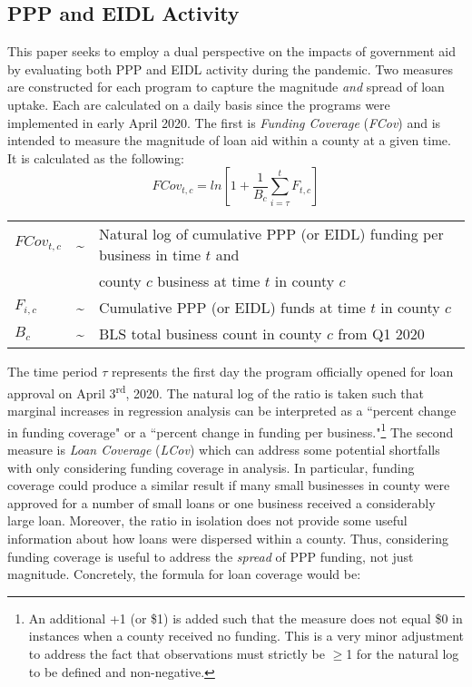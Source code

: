 \documentclass[11pt]{article} %
\begin{document}
\subsection{PPP and EIDL Activity}
This paper seeks to employ a dual perspective on the impacts of government aid by evaluating both PPP and EIDL activity during the pandemic. Two measures are constructed for each program to capture the magnitude \textit{and} spread of loan uptake. Each are calculated on a daily basis since the programs were implemented in early April 2020. The first is \textit{Funding Coverage} (\textit{FCov}) and is intended to measure the magnitude of loan aid within a county at a given time. It is calculated as the following:
\begin{equation}
    FCov_{t,c} = ln\left[1 + \frac{1}{B_{c}}\sum_{i=\tau}^{t}F_{t,c}\right]
\end{equation}
        \begin{center}\begin{tabular}{lll}
        $FCov_{t,c}$ & \sim & Natural log of cumulative PPP (or EIDL) funding per business in time $t$ and \\
        $ $ &  & county $c$ business at time $t$ in county $c$ \\
        $F_{i,c}$ & \sim &  Cumulative PPP (or EIDL) funds at time $t$ in county $c$ \\
        ${B_{c}}$ & \sim & BLS total business count in county $c$ from Q1 2020 \\
        \end{tabular}\end{center}
The time period $\tau$ represents the first day the program officially opened for loan approval on April 3\textsuperscript{rd}, 2020. The natural log of the ratio is taken such that marginal increases in regression analysis can be interpreted as a ``percent change in funding coverage" or a ``percent change in funding per business."\footnote{An additional +1 (or \$1) is added such that the measure does not equal \$0 in instances when a county received no funding. This is a very minor adjustment to address the fact that observations must strictly be $\geq$1  for the natural log to be defined and non-negative.} The second measure is \textit{Loan Coverage} (\textit{LCov}) which can address some potential shortfalls with only considering funding coverage in analysis. In particular, funding coverage could produce a similar result if many small businesses in county were approved for a number of small loans or one business received a considerably large loan. Moreover, the ratio in isolation does not provide some useful information about how loans were dispersed within a county. Thus, considering funding coverage is useful to address the \textit{spread} of PPP funding, not just magnitude. Concretely, the formula for loan coverage would be:
\end{document}
